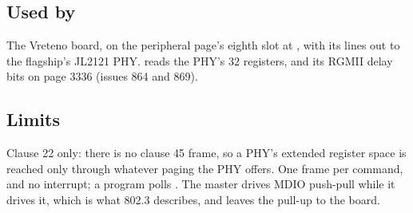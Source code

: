 \subsection*{Used by}

The Vreteno board, on the peripheral page's eighth slot at
, with its lines out to the flagship's JL2121 PHY.
 reads the PHY's 32 registers, and
 its RGMII delay bits on page 3336 (issues 864 and
869).

\subsection*{Limits}

Clause 22 only: there is no clause 45 frame, so a PHY's extended
register space is reached only through whatever paging the PHY
offers. One frame per command, and no interrupt; a program polls
. The master drives MDIO push-pull while it drives it,
which is what 802.3 describes, and leaves the pull-up to the board.
